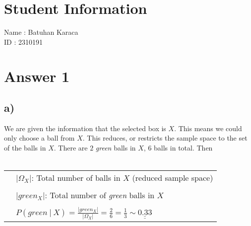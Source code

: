 \documentclass[12pt]{article}
\begin{document}
\section*{Student Information}

Name : Batuhan Karaca \\

ID : 2310191 \\


\section*{Answer 1}
\subsection*{a)}
We are given the information that the selected box is $X$. 
This means we could only choose a ball from $X$. 
This reduces, or restricts the sample space to the set 
of the balls in $X$. There are $2$ \textit{green} 
balls in $X$, $6$ balls in total. \hypertarget{method}{Then}
\\ \\
\begin{tabular}{l l}
    & $|\Omega_X|$: Total number of balls in $X$ (reduced sample space) \\ \\
    & $|green_X|$: Total number of \textit{green} balls in $X$ \\ \\
    & $P(green\ |\ X)=\frac{|green_X|}{|\Omega_X|}=\frac{2}{6}=\frac{1}{3}\sim \underline{\underline{0.33}}$
\end{tabular}
\end{document}
